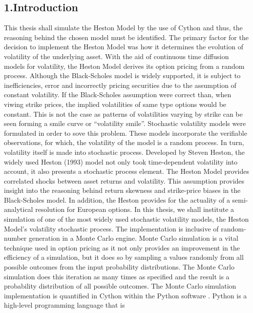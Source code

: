 \documentclass[11pt,]{article}
\begin{document}
\noindent \doublespacing \subsection{1.Introduction}\label{introduction}

This thesis shall simulate the Heston Model by the use of Cython and
thus, the reasoning behind the chosen model must be identified. The
primary factor for the decision to implement the Heston Model was how it
determines the evolution of volatility of the underlying asset. With the
aid of continuous time diffusion models for volatility, the Heston Model
derives its option pricing from a random process. Although the
Black-Scholes model is widely supported, it is subject to
inefficiencies, error and incorrectly pricing securities due to the
assumption of constant volatility. If the Black-Scholes assumption were
correct than, when viwing strike prices, the implied volatilities of
same type options would be constant. This is not the case as patterns of
volatilities varying by strike can be seen forming a smile curve or
``volatility smile''. Stochastic volatility models were formulated in
order to sove this problem. These models incorporate the verifiable
observations, for which, the volatility of the model is a random
process. In turn, volatility itself is made into stochastic process.
Developed by Steven Heston, the widely used Heston (1993) model not only
took time-dependent volatility into account, it also presents a
stochastic process element. The Heston Model provides correlated shocks
between asset returns and volatility. This assumption provides insight
into the reasoning behind return skewness and strike-price biases in the
Black-Scholes model. In addition, the Heston provides for the actuality
of a semi-analytical resolution for European options. In this thesis, we
shall institute a simulation of one of the most widely used stochastic
volatility models, the Heston Model's volatility stochastic process. The
implementation is inclusive of random-number generation in a Monte Carlo
engine. Monte Carlo simulation is a vital technique used in option
pricing as it not only provides an improvement in the efficiency of a
simulation, but it does so by sampling a values randomly from all
possible outcomes from the input probability distributions. The Monte
Carlo simulation does this iteration as many times as specified and the
result is a probability distribution of all possible outcomes. The Monte
Carlo simulation implementation is quantified in Cython within the
Python software . Python is a high-level programming language that is
\end{document}
